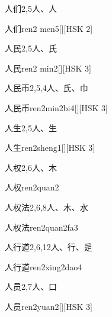 \begin{entry}{人们}{2,5}{⼈、⼈}
  \begin{phonetics}{人们}{ren2 men5}[][HSK 2]
  \end{phonetics}
\end{entry}

\begin{entry}{人民}{2,5}{⼈、⽒}
  \begin{phonetics}{人民}{ren2 min2}[][HSK 3]
  \end{phonetics}
\end{entry}

\begin{entry}{人民币}{2,5,4}{⼈、⽒、⼱}
  \begin{phonetics}{人民币}{ren2min2bi4}[][HSK 3]
  \end{phonetics}
\end{entry}

\begin{entry}{人生}{2,5}{⼈、⽣}
  \begin{phonetics}{人生}{ren2sheng1}[][HSK 3]
  \end{phonetics}
\end{entry}

\begin{entry}{人权}{2,6}{⼈、⽊}
  \begin{phonetics}{人权}{ren2quan2}
  \end{phonetics}
\end{entry}

\begin{entry}{人权法}{2,6,8}{⼈、⽊、⽔}
  \begin{phonetics}{人权法}{ren2quan2fa3}
  \end{phonetics}
\end{entry}

\begin{entry}{人行道}{2,6,12}{⼈、⾏、⾡}
  \begin{phonetics}{人行道}{ren2xing2dao4}
  \end{phonetics}
\end{entry}

\begin{entry}{人员}{2,7}{⼈、⼝}
  \begin{phonetics}{人员}{ren2yuan2}[][HSK 3]
  \end{phonetics}
\end{entry}

